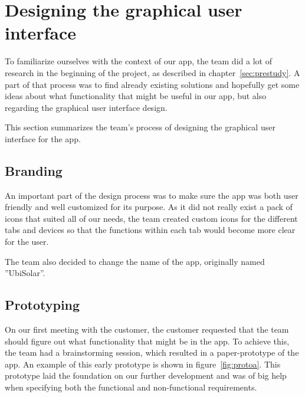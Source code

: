\section{Designing the graphical user interface}
To familiarize ourselves with the context of our app, the team did a lot of research in the beginning of the project, as described in chapter~\ref{sec:prestudy}. A part of that process was to find already existing solutions and hopefully get some ideas about what functionality that might be useful in our app, but also regarding the graphical user interface design.

This section summarizes the team's process of designing the graphical user interface for the app.

\subsection{Branding}
An important part of the design process was to make sure the app was both user friendly and well customized for its purpose. As it did not really exist a pack of icons that suited all of our needs, the team created custom icons for the different tabs and devices so that the functions within each tab would become more clear for the user.

The team also decided to change the name of the app, originally named ''UbiSolar''.



\subsection{Prototyping}
On our first meeting with the customer, the customer requested that the team should figure out what functionality that might be in the app. To achieve this, the team had a brainstorming session, which resulted in a paper-prototype of the app. An example of this early prototype is shown in figure~\ref{fig:protoa}. This prototype laid the foundation on our further development and was of big help when specifying both the functional and non-functional requirements.

